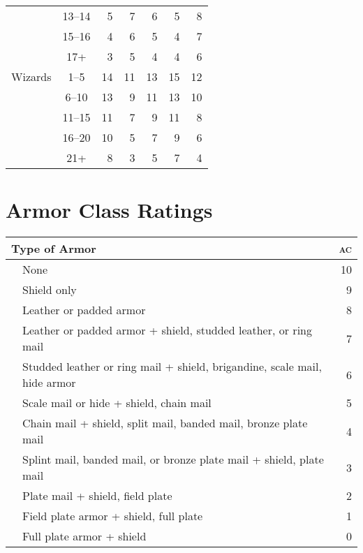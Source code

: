 \documentclass[10pt,letterpaper]{article}
\newcommand{\tnote}[2]{%
  \smash{\raisebox{2pt}{%
      \oldstylenums{\footnotesize\color{black}\begin{tabular}{#1}#2\end{tabular}}}}}
\newcommand{\tcnotes}[3]{%
  \rlap{\tnote{l}{#1}}\hfill #2\hfill\llap{\tnote{r}{#3}}}
\newcommand{\AC}[0]{{\scshape ac}}
\begin{document}
\begin{minipage}[t]{0.600\textwidth}
\begin{tabularx}{\textwidth}{Xcrrrrr}
    & 13--14 &  5 &  7 &  6 &  5 &  8 \\
    & 15--16 &  4 &  6 &  5 &  4 &  7 \\
    &   17+  &  3 &  5 &  4 &  4 &  6 \\
    \midrule
    Wizards
    &  1--5  & 14 & 11 & 13 & 15 & 12 \\
    &  6--10 & 13 &  9 & 11 & 13 & 10 \\
    & 11--15 & 11 &  7 &  9 & 11 &  8 \\
    & 16--20 & 10 &  5 &  7 &  9 &  6 \\
    &   21+  &  8 &  3 &  5 &  7 &  4 \\
    \bottomrule
  \end{tabularx}
\end{minipage}
\hfill
\begin{minipage}[t]{0.390\textwidth}
  \section*{\tcnotes{table 46}{Armor Class Ratings}{phb 99}}
  \begin{tabularx}{\textwidth}{lXr}
    \toprule
    \multicolumn{2}{l}{Type of Armor} & \AC \\
    \midrule
    &\hspace{-1.2em}None & 10 \\
    &\hspace{-1.2em}Shield only & 9 \\
    &\hspace{-1.2em}Leather or padded armor & 8 \\
    &\hspace{-1.2em}Leather or padded armor + shield, studded leather, or ring mail & 7 \\
    &\hspace{-1.2em}Studded leather or ring mail + shield, brigandine, scale mail, hide armor & 6 \\
    &\hspace{-1.2em}Scale mail or hide + shield, chain mail & 5 \\
    &\hspace{-1.2em}Chain mail + shield, split mail, banded mail, bronze plate mail & 4 \\
    &\hspace{-1.2em}Splint mail, banded mail, or bronze plate mail + shield, plate mail & 3 \\
    &\hspace{-1.2em}Plate mail + shield, field plate & 2 \\
    &\hspace{-1.2em}Field plate armor + shield, full plate & 1 \\
    &\hspace{-1.2em}Full plate armor + shield & 0 \\
    \bottomrule
  \end{tabularx}


\end{minipage}
\end{document}
